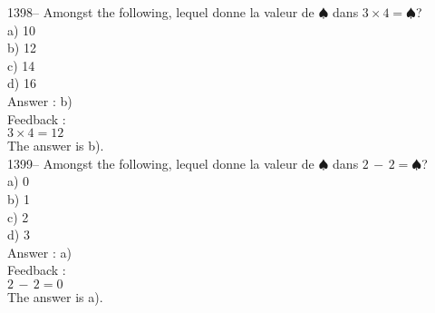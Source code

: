 ﻿\documentclass[letterpaper, 12pt]{article}
\begin{document}
1398-- Amongst the following, lequel donne la valeur de
$\spadesuit$ dans $3\times4=\spadesuit$?\\
a) 10\\
b) 12\\
c) 14\\
d) 16\\

Answer : b)\\

Feedback : \\
$3\times4=12$\\
The answer is b).\\

1399-- Amongst the following, lequel donne la valeur de
$\spadesuit$ dans $2\,-\,2=\spadesuit$?\\
a) 0\\
b) 1\\
c) 2\\
d) 3\\

Answer : a)\\

Feedback : \\
$2\,-\,2=0$\\
The answer is a).\\
\end{document}
